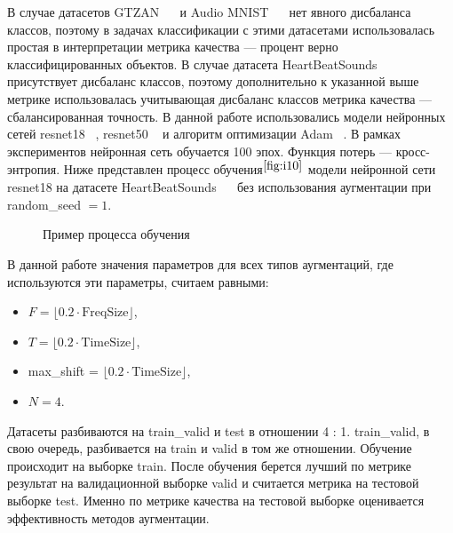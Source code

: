 \documentclass[12pt, fleqn]{article}
\begin{document}
В случае датасетов GTZAN ~\cite{GTZAN_Article}~\cite{GTZAN_kaggle} и Audio MNIST ~\cite{AudioMnistArticle}~\cite{AudioMnistKaggle} нет явного дисбаланса классов, поэтому в задачах классификации с этими датасетами использовалась простая в интерпретации метрика качества --- процент верно классифицированных объектов. В случае датасета HeartBeatSounds ~\cite{HeartbeatSoundsArticle}~\cite{HeartbeatSoundsKaggle} присутствует дисбаланс классов, поэтому дополнительно к указанной выше метрике использовалась учитывающая дисбаланс классов метрика качества --- сбалансированная точность. В данной работе использовались модели нейронных сетей resnet18 ~\cite{Resnet}, resnet50 ~\cite{Resnet} и алгоритм оптимизации Adam ~\cite{Adam}. В рамках экспериментов нейронная сеть обучается 100 эпох. Функция потерь --- кросс-энтропия. Ниже представлен процесс обучения$^{\ref{fig:i10}}$ модели нейронной сети resnet18 на датасете HeartBeatSounds ~\cite{HeartbeatSoundsArticle}~\cite{HeartbeatSoundsKaggle} без использования аугментации при random\_seed $= 1$.

\begin{figure}[ht!]
\caption{Пример процесса обучения}
\label{fig:i10}
\end{figure}

\newpage
В данной работе значения параметров для всех типов аугментаций, где используются эти параметры, считаем равными: 
\begin{itemize}
    \item $F = \lfloor 0.2 \cdot \text{FreqSize} \rfloor$,
    \item $T = \lfloor 0.2 \cdot \text{TimeSize} \rfloor$,
    \item max\_shift = $\lfloor 0.2 \cdot \text{TimeSize} \rfloor$,
    \item $N = 4$.
\end{itemize}

Датасеты разбиваются на train\_valid и test в отношении 4 : 1. train\_valid, в свою очередь, разбивается на train и valid в том же отношении. Обучение происходит на выборке train. После обучения берется лучший по метрике результат на валидационной выборке valid и считается метрика на тестовой выборке test. Именно по метрике качества на тестовой выборке оценивается эффективность методов аугментации.
	
\end{document}
